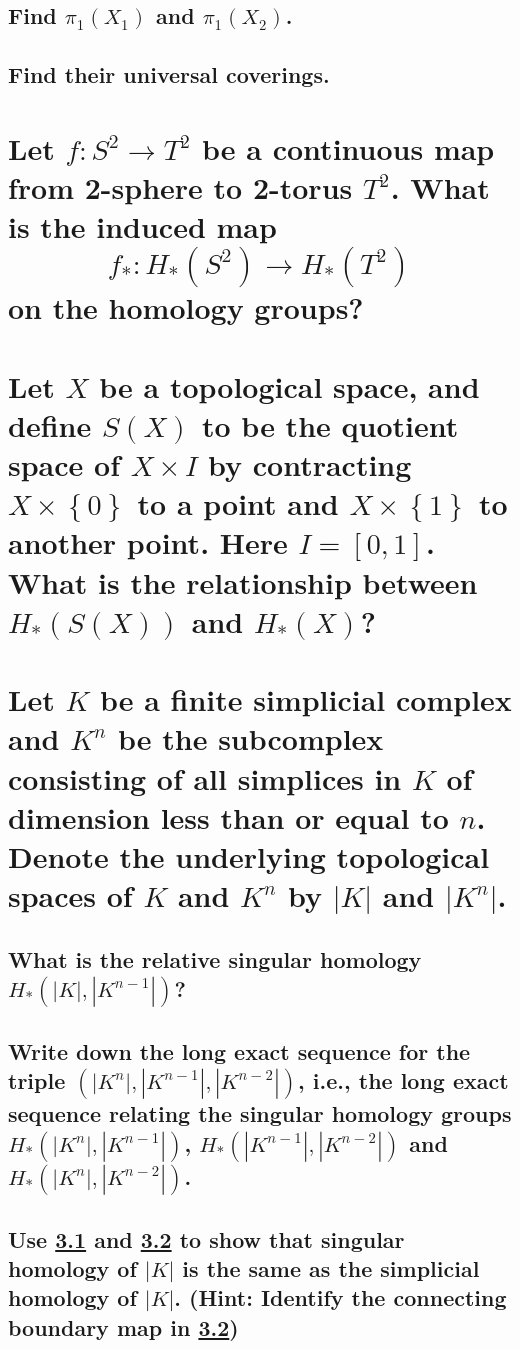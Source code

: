\documentclass[10pt]{article}
\newcommand{\hint}[1]{(Hint: #1)}
\begin{document}
\subsection{Find $\pi_1(X_1)$ and $\pi_1(X_2)$.}

\subsection{Find their universal coverings.}

\section{Let $f: S^2 \to T^2$ be a continuous map from 2-sphere to 2-torus $T^2$. What is the
  induced map 
  $$f_* : H_*(S^2) \to H_*(T^2)$$
  on the homology groups?}

\section{Let $X$ be a topological space, and define $S(X)$ to be the quotient space of $X\times I$
  by contracting $X \times \left\{ 0 \right\} $ to a point and $X \times \left\{ 1 \right\} $ to
  another point. Here $I = [0,1]$. What is the relationship between $H_*(S(X))$ and $H_*(X)$?}

\section{Let $K$ be a finite simplicial complex and $K^n$ be the subcomplex consisting of all
  simplices in $K$ of dimension less than or equal to $n$. Denote the underlying topological spaces
  of $K$ and $K^n$ by $|K|$ and $|K^n|$.}

\subsection{What is the relative singular homology $H_*(|K|, |K^{n-1}|)$?}
\label{former}

\subsection{Write down the long exact sequence for the triple $(|K^n|, |K^{n-1}|, |K^{n-2}|)$, i.e.,
  the long exact sequence relating the singular homology groups $H_*(|K^n|, |K^{n-1}|)$,
  $H_*(|K^{n-1}|, |K^{n-2}|)$ and  $H_*(|K^n|, |K^{n-2}|)$.}
\label{latter}

\subsection{Use \ref{former}  and \ref{latter} to show that singular homology of $|K|$ is the same as the simplicial homology
  of $|K|$. \hint{Identify the connecting boundary map in \ref{latter}}}
\end{document}
